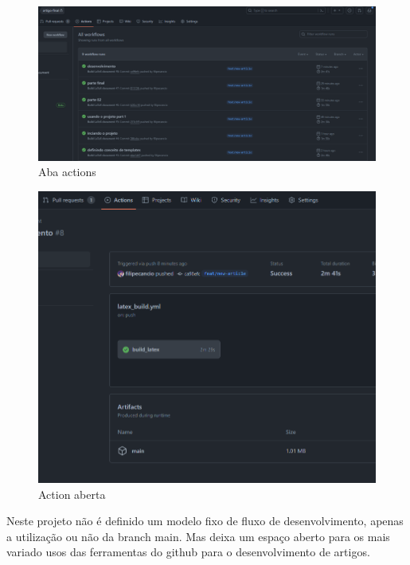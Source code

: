 \begin{figure}[ht]
	\centering
	\includegraphics[width=.5\textwidth]{./images/image10.png}
	\caption{Aba actions}
	\label{fig:image10}
\end{figure}


\begin{figure}[ht]
	\centering
	\includegraphics[width=.5\textwidth]{./images/image11.png}
	\caption{Action aberta}
	\label{fig:image11}
\end{figure}

Neste projeto não é definido um modelo fixo de fluxo de desenvolvimento, apenas a utilização ou não da branch main. Mas deixa um espaço aberto para os mais variado usos das ferramentas do github para o desenvolvimento de artigos.

